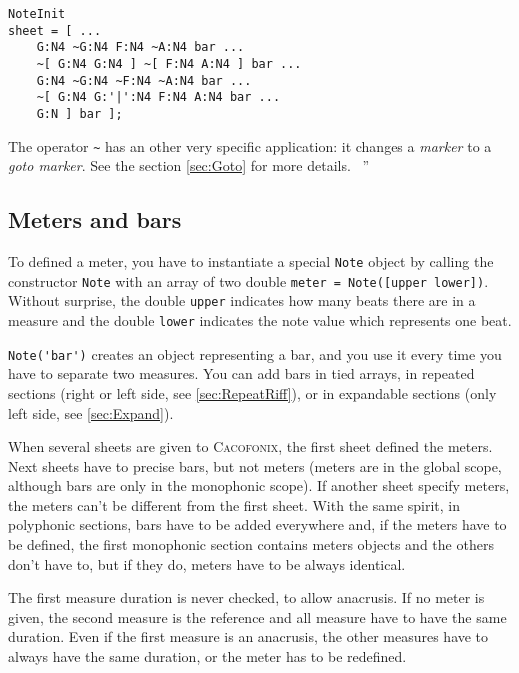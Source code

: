 \documentclass{article}
\newcommand{\cacofonix}{\textsc{Cacofonix}\xspace}
\newcommand{\note}{\lstinline!Note!\xspace}
\newenvironment{meenv}{ \par \noindent \makebox[6em][r]{ \textcolor{mecolor}{Me}: `` --~}}{~''}
\newenvironment{myselfenv}{ \par \noindent \makebox[6em][r]{ \textcolor{myselfcolor}{Myself}: `` --~}}{~''}
\newcommand{\me}[1]{\begin{meenv}#1\end{meenv}}
\newcommand{\myself}[1]{\begin{myselfenv}#1\end{myselfenv}}
\begin{document}
\begin{lstlisting}
NoteInit
sheet = [ ...
	G:N4 ~G:N4 F:N4 ~A:N4 bar ...
	~[ G:N4 G:N4 ] ~[ F:N4 A:N4 ] bar ...
	G:N4 ~G:N4 ~F:N4 ~A:N4 bar ...
	~[ G:N4 G:'|':N4 F:N4 A:N4 bar ...
	G:N ] bar ];
\end{lstlisting}

\begin{meenv}%
The operator \lstinline!~! has an other very specific application: it changes a \emph{marker} to a \emph{goto marker}. See the section \ref{sec:Goto} for more details.%
\end{meenv}

\subsection{Meters and bars}
\label{sec:MetersAndBars}

To defined a meter, you have to instantiate a special \note object by calling the constructor \note with an array of two double \lstinline!meter = Note([upper lower])!. Without surprise, the double \lstinline!upper! indicates how many beats there are in a measure and the double \lstinline!lower! indicates the note value which represents one beat.

\lstinline!Note('bar')! creates an object representing a bar, and you use it every time you have to separate two measures. You can add bars in tied arrays, in repeated sections (right or left side, see \ref{sec:RepeatRiff}), or in expandable sections (only left side, see \ref{sec:Expand}).

When several sheets are given to \cacofonix, the first sheet defined the meters. Next sheets have to precise bars, but not meters (meters are in the global scope, although bars are only in the monophonic scope). If another sheet specify meters, the meters can't be different from the first sheet. With the same spirit, in polyphonic sections, bars have to be added everywhere and, if the meters have to be defined, the first monophonic section contains meters objects and the others don't have to, but if they do, meters have to be always identical.

The first measure duration is never checked, to allow anacrusis. If no meter is given, the second measure is the reference and all measure have to have the same duration. Even if the first measure is an anacrusis, the other measures have to always have the same duration, or the meter has to be redefined.
\end{document}
